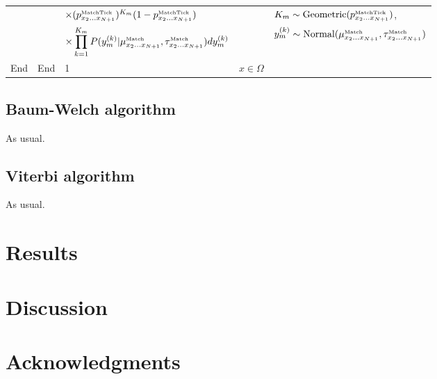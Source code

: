 \documentclass[10pt]{article}
\begin{document}
\begin{tabular}{lllll}
& & $\times (p^{\mbox{\tiny MatchTick}}_{x_2\ldots x_{N+1}})^{K_m} (1-p^{\mbox{\tiny MatchTick}}_{x_2\ldots x_{N+1}})$ & & $K_m \sim \mbox{Geometric}(p^{\mbox{\tiny MatchTick}}_{x_2\ldots x_{N+1}})$, \\
& & $\times \displaystyle \prod_{k=1}^{K_m} P(y^{(k)}_m|\mu^{\mbox{\tiny Match}}_{x_2\ldots x_{N+1}},\tau^{\mbox{\tiny Match}}_{x_2\ldots x_{N+1}}) dy^{(k)}_m$ & & $y_m^{(k)} \sim \mbox{Normal}(\mu^{\mbox{\tiny Match}}_{x_2\ldots x_{N+1}},\tau^{\mbox{\tiny Match}}_{x_2\ldots x_{N+1}})$ \\
End & End & 1 & $x \in \Omega$ & \\
\hline
\end{tabular}




\subsection{Baum-Welch algorithm}

As usual.

\subsection{Viterbi algorithm}

As usual.


\newpage
\section{Results}




\section{Discussion}


\newpage
\section{Acknowledgments}


\end{document}
